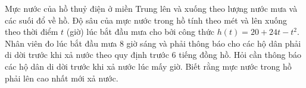 \begin{bt}%
	Mực nước của hồ thuỷ điện ở miền Trung lên và xuống theo lượng nước mưa và các suối đổ về hồ. Độ sâu của mực nước trong hồ tính theo mét và lên xuống theo thời điểm $t$ (giờ) lúc bắt đầu mưa cho bởi công thức $h(t)=20+24 t-t^2$. Nhân viên đo lúc bắt đầu mưa $8$ giờ sáng và phải thông báo cho các hộ dân phải di dời trước khi xả nước theo quy định trước $6$ tiếng đồng hồ. Hỏi cần thông báo các hộ dân di dời trước khi xả nước lúc mấy giờ. Biết rằng mực nước trong hồ phải lên cao nhất mới xả nước.
\end{bt}

